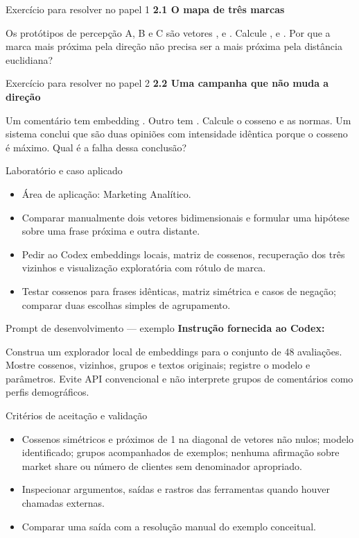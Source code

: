 \documentclass[10pt,aspectratio=169]{beamer}
\begin{document}
\begin{frame}[t]{Exercício para resolver no papel 1}
\small
\small\textbf{2.1 O mapa de três marcas}\par\vspace{4mm}Os protótipos de percepção A, B e C são vetores , e . Calcule , e . Por que a marca mais próxima pela direção não precisa ser a mais próxima pela distância euclidiana?
\end{frame}

\begin{frame}[t]{Exercício para resolver no papel 2}
\small
\small\textbf{2.2 Uma campanha que não muda a direção}\par\vspace{4mm}Um comentário tem embedding . Outro tem . Calcule o cosseno e as normas. Um sistema conclui que são duas opiniões com intensidade idêntica porque o cosseno é máximo. Qual é a falha dessa conclusão?
\end{frame}

\begin{frame}[t]{Laboratório e caso aplicado}
\small
\begin{itemize}
\item Área de aplicação: Marketing Analítico.
\item Comparar manualmente dois vetores bidimensionais e formular uma hipótese sobre uma frase próxima e outra distante.
\item Pedir ao Codex embeddings locais, matriz de cossenos, recuperação dos três vizinhos e visualização exploratória com rótulo de marca.
\item Testar cossenos para frases idênticas, matriz simétrica e casos de negação; comparar duas escolhas simples de agrupamento.
\end{itemize}
\end{frame}

\begin{frame}[t]{Prompt de desenvolvimento — exemplo}
\small
\small\textbf{Instrução fornecida ao Codex:}\par\vspace{5mm}Construa um explorador local de embeddings para o conjunto de 48 avaliações. Mostre cossenos, vizinhos, grupos e textos originais; registre o modelo e parâmetros. Evite API convencional e não interprete grupos de comentários como perfis demográficos.
\end{frame}

\begin{frame}[t]{Critérios de aceitação e validação}
\small
\begin{itemize}
\item Cossenos simétricos e próximos de 1 na diagonal de vetores não nulos; modelo identificado; grupos acompanhados de exemplos; nenhuma afirmação sobre market share ou número de clientes sem denominador apropriado.
\item Inspecionar argumentos, saídas e rastros das ferramentas quando houver chamadas externas.
\item Comparar uma saída com a resolução manual do exemplo conceitual.
\end{itemize}
\end{frame}
\end{document}
